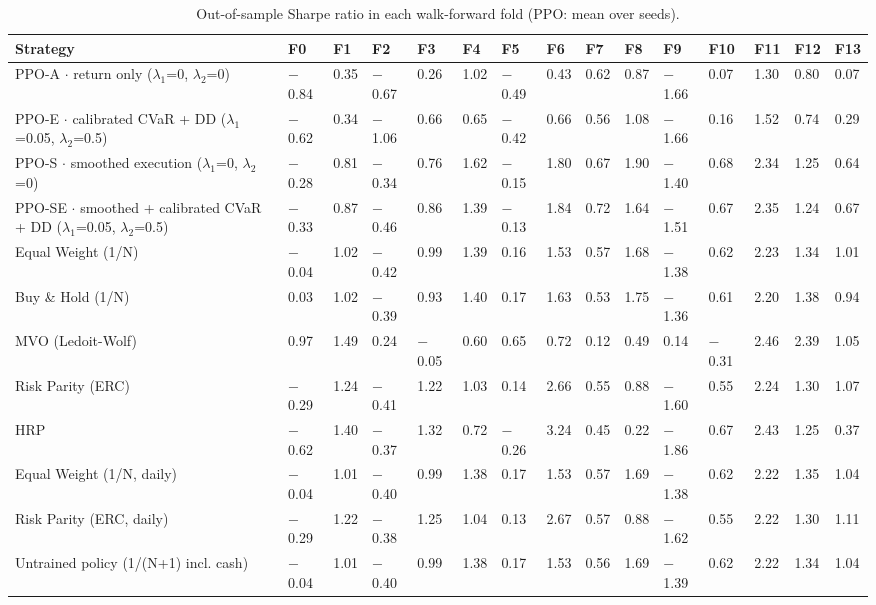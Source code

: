 \documentclass[11pt]{article}
\begin{document}
\begin{table}[!htbp]
\centering\scriptsize
\caption{Out-of-sample Sharpe ratio in each walk-forward fold (PPO: mean over seeds).\label{tab-folds-no}}
\begin{adjustbox}{max width=\linewidth}
\begin{tabular}{@{}lllllllllllllll@{}}
\toprule
Strategy & F0 & F1 & F2 & F3 & F4 & F5 & F6 & F7 & F8 & F9 & F10 & F11 & F12 & F13 \\
\midrule
PPO-A $\cdot$ return only {($\lambda_1$=0, $\lambda_2$=0)} & $-$0.84 & 0.35 & $-$0.67 & 0.26 & 1.02 & $-$0.49 & 0.43 & 0.62 & 0.87 & $-$1.66 & 0.07 & 1.30 & 0.80 & 0.07 \\
PPO-E $\cdot$ calibrated CVaR + DD {($\lambda_1$=0.05, $\lambda_2$=0.5)} & $-$0.62 & 0.34 & $-$1.06 & 0.66 & 0.65 & $-$0.42 & 0.66 & 0.56 & 1.08 & $-$1.66 & 0.16 & 1.52 & 0.74 & 0.29 \\
PPO-S $\cdot$ smoothed execution {($\lambda_1$=0, $\lambda_2$=0)} & $-$0.28 & 0.81 & $-$0.34 & 0.76 & 1.62 & $-$0.15 & 1.80 & 0.67 & 1.90 & $-$1.40 & 0.68 & 2.34 & 1.25 & 0.64 \\
PPO-SE $\cdot$ smoothed + calibrated CVaR + DD {($\lambda_1$=0.05, $\lambda_2$=0.5)} & $-$0.33 & 0.87 & $-$0.46 & 0.86 & 1.39 & $-$0.13 & 1.84 & 0.72 & 1.64 & $-$1.51 & 0.67 & 2.35 & 1.24 & 0.67 \\
Equal Weight (1/N) & $-$0.04 & 1.02 & $-$0.42 & 0.99 & 1.39 & 0.16 & 1.53 & 0.57 & 1.68 & $-$1.38 & 0.62 & 2.23 & 1.34 & 1.01 \\
Buy \& Hold (1/N) & 0.03 & 1.02 & $-$0.39 & 0.93 & 1.40 & 0.17 & 1.63 & 0.53 & 1.75 & $-$1.36 & 0.61 & 2.20 & 1.38 & 0.94 \\
MVO (Ledoit-Wolf) & 0.97 & 1.49 & 0.24 & $-$0.05 & 0.60 & 0.65 & 0.72 & 0.12 & 0.49 & 0.14 & $-$0.31 & 2.46 & 2.39 & 1.05 \\
Risk Parity (ERC) & $-$0.29 & 1.24 & $-$0.41 & 1.22 & 1.03 & 0.14 & 2.66 & 0.55 & 0.88 & $-$1.60 & 0.55 & 2.24 & 1.30 & 1.07 \\
HRP & $-$0.62 & 1.40 & $-$0.37 & 1.32 & 0.72 & $-$0.26 & 3.24 & 0.45 & 0.22 & $-$1.86 & 0.67 & 2.43 & 1.25 & 0.37 \\
Equal Weight (1/N, daily) & $-$0.04 & 1.01 & $-$0.40 & 0.99 & 1.38 & 0.17 & 1.53 & 0.57 & 1.69 & $-$1.38 & 0.62 & 2.22 & 1.35 & 1.04 \\
Risk Parity (ERC, daily) & $-$0.29 & 1.22 & $-$0.38 & 1.25 & 1.04 & 0.13 & 2.67 & 0.57 & 0.88 & $-$1.62 & 0.55 & 2.22 & 1.30 & 1.11 \\
Untrained policy (1/(N+1) incl. cash) & $-$0.04 & 1.01 & $-$0.40 & 0.99 & 1.38 & 0.17 & 1.53 & 0.56 & 1.69 & $-$1.39 & 0.62 & 2.22 & 1.34 & 1.04 \\
\bottomrule
\end{tabular}
\end{adjustbox}
\end{table}
\end{document}
